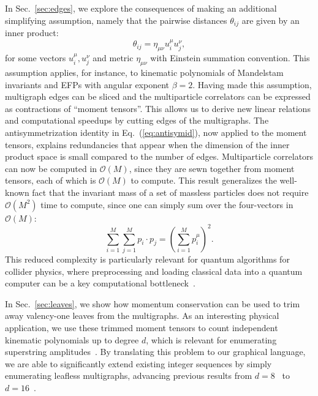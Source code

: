\documentclass[aps,prd,floatfix,preprintnumbers,twocolumn,groupedaddress,nofootinbib,longbibliography,10pt]{revtex4-1}
\renewcommand{\O}{\mathcal{O}}
\DeclareRobustCommand{\Sec}[1]{Sec.~\ref{#1}}
\DeclareRobustCommand{\Eq}[1]{Eq.~(\ref{#1})}
\begin{document}
In \Sec{sec:edges}, we explore the consequences of making an additional simplifying assumption, namely that the pairwise distances $\theta_{ij}$ are given by an inner product:
%
\begin{equation}
\label{eq:innerprod}
\theta_{ij} = \eta_{\mu\nu} u_i^\mu u_j^\nu,
\end{equation}
%
for some vectors $u_i^\mu,u_j^\nu$ and metric $\eta_{\mu\nu}$ with Einstein summation convention.
%
This assumption applies, for instance, to kinematic polynomials of Mandelstam invariants and EFPs with angular exponent $\beta=2$.
%
Having made this assumption, multigraph edges can be sliced and the multiparticle correlators can be expressed as contractions of 
``moment tensors''.
%
This allows us to derive new linear relations and computational speedups by cutting edges of the multigraphs.
%
The antisymmetrization identity in \Eq{eq:antisymid}, now applied to the moment tensors, explains redundancies that appear when the dimension of the inner product space is small compared to the number of edges.
%
Multiparticle correlators can now be computed in $\O(M)$, since they are sewn together from moment tensors, each of which is $\O(M)$ to compute.
%
This result generalizes the well-known fact that the invariant mass of a set of massless particles does not require $\O(M^2)$ time to compute, since one can simply sum over the four-vectors in $\O(M)$:
%
\begin{equation}
\label{eq:massexample}
\sum_{i = 1}^M \sum_{j = 1}^M p_i \cdot p_j = \left(\sum_{i = 1}^{M} p_i^\mu \right)^2.
\end{equation}
%
This reduced complexity is particularly relevant for quantum algorithms for collider physics, where preprocessing and loading classical data into a quantum computer can be a key computational bottleneck~\cite{Wei:2019rqy}.


In \Sec{sec:leaves}, we show how momentum conservation can be used to trim away valency-one leaves from the multigraphs.
%
As an interesting physical application, we use these trimmed moment tensors to count independent kinematic polynomials up to degree $d$, which is relevant for enumerating superstring amplitudes~\cite{Boels:2013jua}.
%
By translating this problem to our graphical language, we are able to significantly extend existing integer sequences by simply enumerating leafless multigraphs, advancing previous results from $d = 8$~\cite{Boels:2013jua,oeisA226919} to $d = 16$~\cite{oeisA307317,oeisA307316}.
\end{document}
